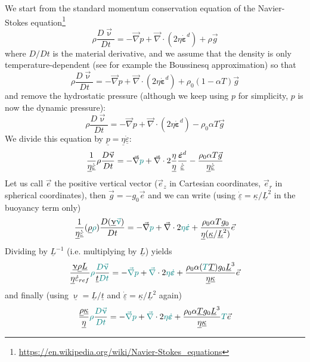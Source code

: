 \documentclass[a4paper,11pt]{article}
\begin{document}
We start from the standard momentum conservation equation of the Navier-Stokes 
equation\footnote{\url{https://en.wikipedia.org/wiki/Navier-Stokes_equations}}
\[
\rho \frac{D \vec\upnu}{D t}
= -\vec\nabla p + \vec\nabla \cdot (2 \eta \dot{\bm\varepsilon}^d)
+ \rho \vec{g} 
\]
where $D/Dt$ is the material derivative, and we assume that the density is 
only temperature-dependent (see for example the Boussinesq approximation) so that
\[
\rho \frac{D \vec\upnu}{D t}
= -\vec\nabla p + \vec\nabla \cdot (2 \eta \dot{\bm\varepsilon}^d)
+ \rho_0(1-\alpha T) \vec{g} 
\]
and remove the hydrostatic pressure (although we keep using $p$ for simplicity, $p$ is now the dynamic pressure):
\[
\rho \frac{D \vec\upnu}{D t}
=
-\vec\nabla p + \vec\nabla \cdot (2 \eta \dot{\bm\varepsilon}^d)
- \rho_0\alpha T \vec{g} 
\]
We divide this equation by 
$\underline{p}=\underline{\eta}\dot{\underline{\varepsilon}}$:
\[
\frac{1}{\underline{\eta}\dot{\underline{\varepsilon}}} \rho
\frac{D \vec\upnu}{D t} 
=
-\vec\nabla {\color{teal}p} + \vec\nabla \cdot 2 \frac{\eta}{\underline{\eta}} \frac{\dot{\bm\varepsilon}^d}{\dot{\underline{\varepsilon}}}
- \frac{\rho_0\alpha T \vec{g}}{\underline{\eta} \dot{\underline{\varepsilon}}} 
\]
Let us call $\vec{e}$ the positive vertical vector ($\vec{e}_z$ in Cartesian coordinates, $\vec{e}_r$ in spherical coordinates), then 
$\vec{g} = -g_0 \vec{e}$ and we can write 
(using $\dot{\underline{\varepsilon}}=\underline{\kappa}/\underline{L}^2$
in the buoyancy term only)
\[
\frac{1}{\underline{\eta}\dot{\underline{\varepsilon}}}
(\underline{\rho}{\color{teal}\rho})\frac{D(\underline{\upnu} {\color{teal}\vec\upnu})}{D t}
=
-\vec\nabla {\color{teal}p} + \vec\nabla \cdot 2 {\color{teal} \eta} {\color{teal} \dot{\bm\varepsilon}}
+ \frac{\rho_0\alpha T g_0 }{\underline{\eta} (\underline{\kappa}/ \underline{L}^2)} \vec{e}
\]
Dividing by $\underline{L}^{-1}$ (i.e. multiplying by $\underline{L}$) yields
\[
\frac{\underline{\upnu} \underline{\rho} \underline{L}}{\underline{\eta}\dot{\varepsilon}_{ref}  }
{\color{teal}\rho} \frac{{\color{teal} D \vec\upnu}}{ \underline{t} {\color{teal} D t}}
=
-{\color{teal} \vec\nabla} {\color{teal}p} + {\color{teal} \vec\nabla} \cdot 2 {\color{teal} \eta} {\color{teal} \dot{\bm\varepsilon}}
+ \frac{\rho_0\alpha ({\color{teal}T}\underline{T}) g_0 \underline{L}^3}{\underline{\eta} \underline{\kappa}} \vec{e}
\]
and finally (using $\underline{\upnu}=\underline{L}/\underline{t}$
and 
$\dot{\underline{\varepsilon}}=\underline{\kappa}/\underline{L}^2$ again) 
\[
\frac{\underline{\rho} \underline{\kappa}}{\underline{\eta}}
{\color{teal}\rho} \frac{{\color{teal} D \vec\upnu}}{\color{teal} D t}
=
-{\color{teal} \vec\nabla} {\color{teal}p} + {\color{teal} \vec\nabla} \cdot 2 {\color{teal} \eta} {\color{teal} \dot{\bm\varepsilon}}
+ \frac{\rho_0\alpha \underline{T} g_0 \underline{L}^3}{\underline{\eta} \underline{\kappa}} {\color{teal} T} \vec{e}
\]
\end{document}
